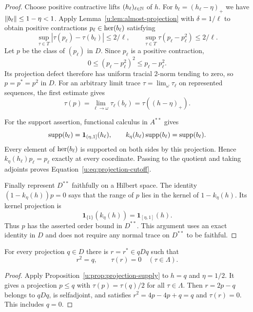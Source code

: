 \begin{proof}
Choose positive contractive lifts $(h_\ell)_{\ell\in\mathbb N}$ of $h$.
For $b_\ell=(h_\ell-\eta)_+$ we have
$\lVert b_\ell\rVert\le1-\eta<1$.  Apply
Lemma~\ref{u:lem:almost-projection} with $\delta=1/\ell$ to obtain
positive contractions $p_\ell\in\operatorname{her}(b_\ell)$ satisfying
\[
 \sup_{\tau\in T}|\tau(p_\ell)-\tau(b_\ell)|\le2/\ell,
 \qquad
 \sup_{\tau\in T}\tau(p_\ell-p_\ell^2)\le2/\ell.
\]
Let $p$ be the class of $(p_\ell)$ in $D$.  Since $p_\ell$ is a
positive contraction,
\[
 0\le(p_\ell-p_\ell^2)^2\le p_\ell-p_\ell^2.
\]
Its projection defect therefore has uniform tracial $2$-norm tending
to zero, so $p=p^*=p^2$ in $D$.  For an arbitrary limit trace
$\tau=\lim_\omega\tau_\ell$ on represented sequences, the first
estimate gives
\[
 \tau(p)=\lim_{\ell\to\omega}\tau_\ell(b_\ell)
        =\tau((h-\eta)_+).
\]

For the support assertion, functional calculus in $A^{**}$ gives
\[
 \operatorname{supp}(b_\ell)=\mathbf 1_{(\eta,1]}(h_\ell),
 \qquad k_\eta(h_\ell)\operatorname{supp}(b_\ell)=\operatorname{supp}(b_\ell).
\]
Every element of $\operatorname{her}(b_\ell)$ is supported on both sides by this
projection.  Hence $k_\eta(h_\ell)p_\ell=p_\ell$ exactly at every
coordinate.  Passing to the quotient and taking adjoints proves
Equation~\eqref{u:eq:projection-cutoff}.

Finally represent $D^{**}$ faithfully on a Hilbert space.  The identity
$(1-k_\eta(h))p=0$ says that the range of $p$ lies in the kernel of
$1-k_\eta(h)$.  Its kernel projection is
\[
 \mathbf 1_{\{1\}}(k_\eta(h))
       =\mathbf 1_{[\eta,1]}(h).
\]
Thus $p$ has the asserted order bound in $D^{**}$.  This argument uses
an exact identity in $D$ and does not require any normal trace on
$D^{**}$ to be faithful.
\end{proof}

\begin{corollary}
\label{u:cor:corner-symmetry}
For every projection $q\in D$ there is $r=r^*\in qDq$ such that
\[
 r^2=q,\qquad \tau(r)=0\quad(\tau\in\Lambda).
\]
\end{corollary}

\begin{proof}
Apply Proposition~\ref{u:prop:projection-supply} to $h=q$ and
$\eta=1/2$.  It gives a projection $p\le q$ with
$\tau(p)=\tau(q)/2$ for all $\tau\in\Lambda$.  Then $r=2p-q$
belongs to $qDq$, is selfadjoint, and satisfies
$r^2=4p-4p+q=q$ and $\tau(r)=0$.  This includes $q=0$.
\end{proof}

